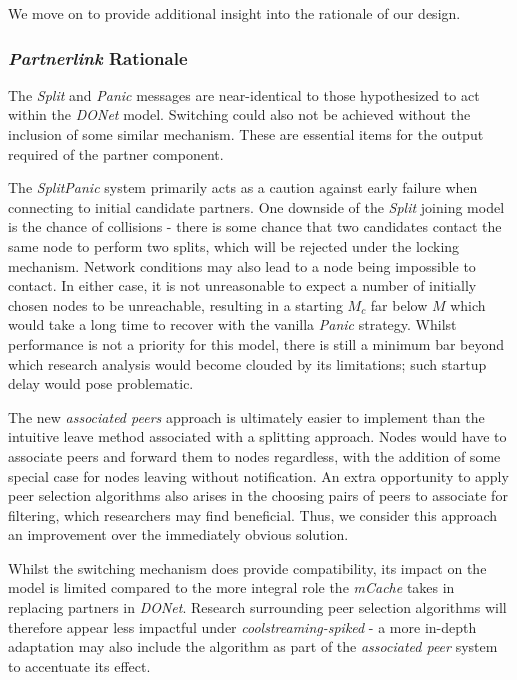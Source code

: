 \documentclass[12pt,a4paper]{article}
\begin{document}
We move on to provide additional insight into the rationale of our design.

\subsubsection{\textit{Partnerlink} Rationale} \label{css:partnerlink:rationale}
The \textit{Split} and \textit{Panic} messages are near-identical to those hypothesized to act within the \textit{DONet} model. Switching could also not be achieved without the inclusion of some similar mechanism. These are essential items for the output required of the partner component.

The \textit{SplitPanic} system primarily acts as a caution against early failure when connecting to initial candidate partners. One downside of the \textit{Split} joining model is the chance of collisions - there is some chance that two candidates contact the same node to perform two splits, which will be rejected under the locking mechanism. Network conditions may also lead to a node being impossible to contact. In either case, it is not unreasonable to expect a number of initially chosen nodes to be unreachable, resulting in a starting \(M_c\) far below \(M\) which would take a long time to recover with the vanilla \textit{Panic} strategy. Whilst performance is not a priority for this model, there is still a minimum bar beyond which research analysis would become clouded by its limitations; such startup delay would pose problematic.

The new \textit{associated peers} approach is ultimately easier to implement than the intuitive leave method associated with a splitting approach. Nodes would have to associate peers and forward them to nodes regardless, with the addition of some special case for nodes leaving without notification. An extra opportunity to apply peer selection algorithms also arises in the choosing pairs of peers to associate for filtering, which researchers may find beneficial. Thus, we consider this approach an improvement over the immediately obvious solution.

Whilst the switching mechanism does provide compatibility, its impact on the model is limited compared to the more integral role the \textit{mCache} takes in replacing partners in \textit{DONet}. Research surrounding peer selection algorithms will therefore appear less impactful under \textit{coolstreaming-spiked} - a more in-depth adaptation may also include the algorithm as part of the \textit{associated peer} system to accentuate its effect.
\end{document}
